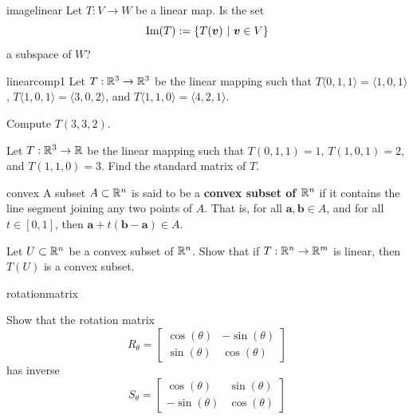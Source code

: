 \begin{problem}{imagelinear}
Let $T : V \to W$ be a linear map.  Is the set $$\textnormal{Im}(T) := \{ T(\bm{v}) \ | \ \bm{v} \in V\}$$ a subspace of $W$?
\end{problem}

\begin{problem}{linearcomp1}
    Let $T : \mathbb{R}^3 \to \mathbb{R}^3$ be the linear mapping such that $T\langle0,1,1\rangle = \langle1,0,1\rangle$, $T\langle1,0,1\rangle = \langle3,0,2\rangle$, and $T\langle1,1,0\rangle = \langle4,2,1\rangle$. 
    
    Compute $T(3, 3, 2)$.
\end{problem}

\begin{problem}
    Let $T : \mathbb{R}^3 \to \mathbb{R}$ be the linear mapping such that $T(0,1,1) = 1$, $T(1,0,1) = 2$, and $T(1,1,0) = 3$.  Find the standard matrix of $T$.
\end{problem}

\begin{problem}{convex}
     A subset $A \subset \mathbb{R}^n$ is said to be a \textbf{convex subset of $\mathbb{R}^n$} if it contains the line segment joining any two points of $A$.  That is, for all $\bm{a}, \bm{b} \in A$, and for all $t \in [0,1]$, then $\bm{a} + t(\bm{b} -\bm{a}) \in A$.
     
     Let $U \subset \mathbb{R}^n$ be a convex subset of $\mathbb{R}^n$.  Show that if $T: \mathbb{R}^n \to \mathbb{R}^m$ is linear, then $T(U)$ is a convex subset.
\end{problem}


\begin{problem}{rotationmatrix}
    
    Show that the rotation matrix \begin{equation*}
R_\theta = 
\begin{bmatrix}
\cos(\theta) & -\sin(\theta) \\
\sin(\theta) & \cos(\theta)
\end{bmatrix}
\end{equation*}
has inverse \begin{equation*}
S_{\theta} = 
\begin{bmatrix}
\cos(\theta) & \sin(\theta) \\
-\sin(\theta) & \cos(\theta)
\end{bmatrix}
\end{equation*}
    
\end{problem}

